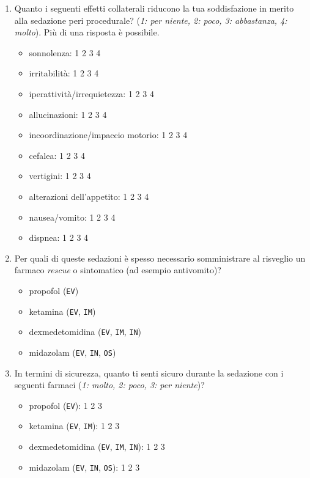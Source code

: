 \begin{tcolorbox}[breakable,notitle,boxrule=0pt,colback=xkcdCloudyBlue!30,colframe=xkcdCloudyBlue!30]
\begin{enumerate}
           \item Quanto i seguenti effetti collaterali riducono la tua soddisfazione in merito alla sedazione peri procedurale? (\emph{1: per niente, 2: poco, 3: abbastanza, 4: molto}). Più di una risposta è possibile. 
           \begin{itemize}
               \item sonnolenza:     1 2 3 4
               \item irritabilità:   1 2 3 4
               \item iperattività/irrequietezza: 1 2 3 4
               \item allucinazioni: 1 2 3 4
               \item incoordinazione/impaccio motorio: 1 2 3 4
               \item cefalea: 1 2 3 4
               \item vertigini: 1 2 3 4
               \item alterazioni dell’appetito: 1 2 3 4
               \item nausea/vomito: 1 2 3 4
               \item dispnea: 1 2 3 4
           \end{itemize}
           
           \item Per quali di queste sedazioni è spesso necessario somministrare al risveglio un farmaco \emph{rescue} o sintomatico (ad esempio antivomito)?
           \begin{itemize}
               \item propofol (\texttt{EV})
               \item ketamina (\texttt{EV}, \texttt{IM})
               \item dexmedetomidina (\texttt{EV}, \texttt{IM}, \texttt{IN})
               \item midazolam (\texttt{EV}, \texttt{IN}, \texttt{OS})
           \end{itemize}
           
           \item In termini di sicurezza, quanto ti senti sicuro durante la sedazione con i seguenti farmaci (\emph{1: molto, 2: poco, 3: per niente})?
           \begin{itemize}
               \item propofol (\texttt{EV}): 1 2 3
               \item ketamina (\texttt{EV}, \texttt{IM}): 1 2 3
               \item dexmedetomidina (\texttt{EV}, \texttt{IM}, \texttt{IN}): 1 2 3
               \item midazolam (\texttt{EV}, \texttt{IN}, \texttt{OS}): 1 2 3
           \end{itemize}
           

\end{enumerate}
\end{tcolorbox}
